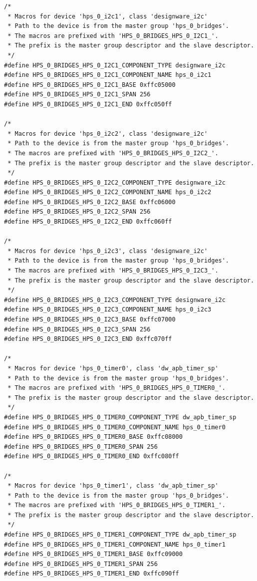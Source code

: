 \documentclass[conference]{IEEEtran}
\begin{document}
\begin{lstlisting}
/*
 * Macros for device 'hps_0_i2c1', class 'designware_i2c'
 * Path to the device is from the master group 'hps_0_bridges'.
 * The macros are prefixed with 'HPS_0_BRIDGES_HPS_0_I2C1_'.
 * The prefix is the master group descriptor and the slave descriptor.
 */
#define HPS_0_BRIDGES_HPS_0_I2C1_COMPONENT_TYPE designware_i2c
#define HPS_0_BRIDGES_HPS_0_I2C1_COMPONENT_NAME hps_0_i2c1
#define HPS_0_BRIDGES_HPS_0_I2C1_BASE 0xffc05000
#define HPS_0_BRIDGES_HPS_0_I2C1_SPAN 256
#define HPS_0_BRIDGES_HPS_0_I2C1_END 0xffc050ff

/*
 * Macros for device 'hps_0_i2c2', class 'designware_i2c'
 * Path to the device is from the master group 'hps_0_bridges'.
 * The macros are prefixed with 'HPS_0_BRIDGES_HPS_0_I2C2_'.
 * The prefix is the master group descriptor and the slave descriptor.
 */
#define HPS_0_BRIDGES_HPS_0_I2C2_COMPONENT_TYPE designware_i2c
#define HPS_0_BRIDGES_HPS_0_I2C2_COMPONENT_NAME hps_0_i2c2
#define HPS_0_BRIDGES_HPS_0_I2C2_BASE 0xffc06000
#define HPS_0_BRIDGES_HPS_0_I2C2_SPAN 256
#define HPS_0_BRIDGES_HPS_0_I2C2_END 0xffc060ff

/*
 * Macros for device 'hps_0_i2c3', class 'designware_i2c'
 * Path to the device is from the master group 'hps_0_bridges'.
 * The macros are prefixed with 'HPS_0_BRIDGES_HPS_0_I2C3_'.
 * The prefix is the master group descriptor and the slave descriptor.
 */
#define HPS_0_BRIDGES_HPS_0_I2C3_COMPONENT_TYPE designware_i2c
#define HPS_0_BRIDGES_HPS_0_I2C3_COMPONENT_NAME hps_0_i2c3
#define HPS_0_BRIDGES_HPS_0_I2C3_BASE 0xffc07000
#define HPS_0_BRIDGES_HPS_0_I2C3_SPAN 256
#define HPS_0_BRIDGES_HPS_0_I2C3_END 0xffc070ff

/*
 * Macros for device 'hps_0_timer0', class 'dw_apb_timer_sp'
 * Path to the device is from the master group 'hps_0_bridges'.
 * The macros are prefixed with 'HPS_0_BRIDGES_HPS_0_TIMER0_'.
 * The prefix is the master group descriptor and the slave descriptor.
 */
#define HPS_0_BRIDGES_HPS_0_TIMER0_COMPONENT_TYPE dw_apb_timer_sp
#define HPS_0_BRIDGES_HPS_0_TIMER0_COMPONENT_NAME hps_0_timer0
#define HPS_0_BRIDGES_HPS_0_TIMER0_BASE 0xffc08000
#define HPS_0_BRIDGES_HPS_0_TIMER0_SPAN 256
#define HPS_0_BRIDGES_HPS_0_TIMER0_END 0xffc080ff

/*
 * Macros for device 'hps_0_timer1', class 'dw_apb_timer_sp'
 * Path to the device is from the master group 'hps_0_bridges'.
 * The macros are prefixed with 'HPS_0_BRIDGES_HPS_0_TIMER1_'.
 * The prefix is the master group descriptor and the slave descriptor.
 */
#define HPS_0_BRIDGES_HPS_0_TIMER1_COMPONENT_TYPE dw_apb_timer_sp
#define HPS_0_BRIDGES_HPS_0_TIMER1_COMPONENT_NAME hps_0_timer1
#define HPS_0_BRIDGES_HPS_0_TIMER1_BASE 0xffc09000
#define HPS_0_BRIDGES_HPS_0_TIMER1_SPAN 256
#define HPS_0_BRIDGES_HPS_0_TIMER1_END 0xffc090ff


\end{lstlisting}
\end{document}

